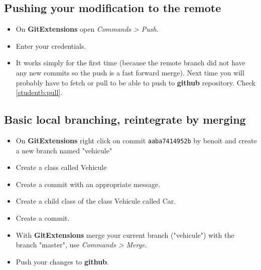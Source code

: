 \documentclass[11pt,amsfonts,amsmath]{article}
\begin{document}
\subsection{Pushing your modification to the remote}\label{studenta:commit}
\begin{itemize}
\item On \textbf{GitExtensions} open \emph{Commands > Push}.
\item Enter your credentials.
\item It works simply for the first time (because the remote branch did not have any new commits so the push is a fast forward merge). Next time you will probably have to fetch or pull to be able to push to \textbf{github} repository. Check \ref{studentb:pull}.
\end{itemize}

\subsection{Basic local branching, reintegrate by merging}\label{sudenta:merge}
\begin{itemize}
\item On \textbf{GitExtensions} right click on commit \texttt{aaba7414952b} by benoit and create a new branch named "vehicule"
\item Create a class called Vehicule
\item Create a commit with an appropriate message.
\item Create a child class of the class Vehicule called Car.
\item Create a commit.
\item With \textbf{GitExtensions} merge your current branch ("vehicule") with the branch "master", use \emph{Commands > Merge}.
\item Push your changes to \textbf{github}.
\end{itemize}
\end{document}
